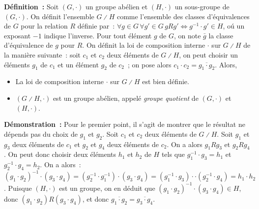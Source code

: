\noindent\textbf{Définition :} Soit $(G, \cdot)$ un groupe abélien et $(H, \cdot)$ un sous-groupe de $(G, \cdot)$.
    On définit l'ensemble $G \divslash H$ comme l'ensemble des classes d'équivalences de $G$ pour la relation $R$ définie par : $\forall g \in G \, \forall g' \in G \, g R g' \Leftrightarrow g^{-1} \cdot g' \in H$, oú un exposant $-1$ indique l'inverse. 
    Pour tout élément $g$ de $G$, on note $\bar{g}$ la classe d'équivalence de $g$ pour $R$.
    On définit la loi de composition interne $\cdot$ sur $G \divslash H$ de la manière suivante : soit $c_1$ et $c_2$ deux éléments de $G \divslash H$, on peut choisir un éléments $g_1$ de $c_1$ et un élément $g_2$ de $c_2$ ; on pose alors $c_1 \cdot c_2 = \overline{g_1 \cdot g_2}$. 
    Alors, 
    \begin{itemize}[nosep]
        \item La loi de composition interne $\cdot$ sur $G \divslash H$ est bien définie.
        \item $(G \divslash H, \cdot)$ est un groupe abélien, appelé \textit{groupe quotient} de $(G, \cdot)$ et $(H, \cdot)$.
    \end{itemize}

\medskip

\noindent\textbf{Démonstration :} Pour le premier point, il s'agit de montrer que le résultat ne dépends pas du choix de $g_1$ et $g_2$.
    Soit $c_1$ et $c_2$ deux éléments de $G \divslash H$. 
    Soit $g_1$ et $g_3$ deux éléments de $c_1$ et $g_2$ et $g_4$ deux éléments de $c_2$.
    On a alors $g_1 R g_3$ et $g_2 R g_4$.
    On peut donc choisir deux éléments $h_1$ et $h_2$ de $H$ tels que $g_1^{-1} \cdot g_3 = h_1$ et $g_2^{-1} \cdot g_4 = h_2$.
    On a alors : $(g_1 \cdot g_2)^{-1} \cdot (g_3 \cdot g_4) = (g_2^{-1} \cdot g_1^{-1}) \cdot (g_3 \cdot g_4) = (g_1^{-1} \cdot g_3) \cdot \cdot (g_2^{-1} \cdot g_4) = h_1 \cdot h_2$. 
    Puisque $(H, \cdot)$ est un groupe, on en déduit que $(g_1 \cdot g_2)^{-1} \cdot (g_3 \cdot g_4) \in H$, donc $(g_1 \cdot g_2) R (g_3 \cdot g_4)$, et donc $\overline{g_1 \cdot g_2} = \overline{g_3 \cdot g_4}$.

